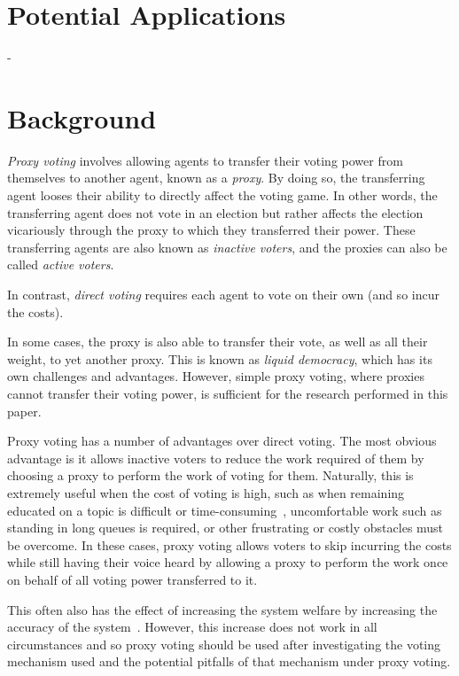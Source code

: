 \section{Potential Applications}\label{sec:potential-applications}
- %


\section{Background}\label{sec:background}
\textit{Proxy voting} involves allowing agents to transfer their voting power
from themselves to another agent, known as a \textit{proxy}\cite[para.~1.4]
{Cohensius2017}.
By doing so, the transferring agent looses their ability to directly affect the
voting game.
In other words, the transferring agent does not vote in an election but rather
affects the election vicariously through the proxy to which they transferred
their power.
These transferring agents are also known as \textit{inactive voters}, and the
proxies can also be called \textit{active voters}.

In contrast, \textit{direct voting} requires each agent to vote on their own
(and so incur the costs).

In some cases, the proxy is also able to transfer their vote, as well as all
their weight, to yet another proxy.
This is known as \textit{liquid democracy}, which has its own challenges and
advantages.
However, simple proxy voting, where proxies cannot transfer their voting power,
is sufficient for the research performed in this paper.

Proxy voting has a number of advantages over direct voting.
The most obvious advantage is it allows inactive voters to reduce the work
required of them by choosing a proxy to perform the work of voting for them.
Naturally, this is extremely useful when the cost of voting is high, such as
when remaining educated on a topic is difficult or
time-consuming~\cite[para.~1.1]{Mueller1972}, uncomfortable work such as standing
in long queues is required, or other frustrating or costly obstacles must be
overcome.
In these cases, proxy voting allows voters to skip incurring the costs while
still having their voice heard by allowing a proxy to perform the work once on
behalf of all voting power transferred to it.

This often also has the effect of increasing the system welfare by
increasing the accuracy of the system~\cite[sec.~1.1]{Cohensius2017}.
However, this increase does not work in all circumstances and so proxy voting
should be used after investigating the voting mechanism used and the potential
pitfalls of that mechanism under proxy voting.

